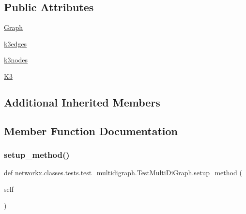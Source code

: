 \subsection*{Public Attributes}
\begin{DoxyCompactItemize}
\item 
\hyperlink{classnetworkx_1_1classes_1_1tests_1_1test__multidigraph_1_1TestMultiDiGraph_aa5a28c7ba894f6eb7af8f5b27f5449e2}{Graph}
\item 
\hyperlink{classnetworkx_1_1classes_1_1tests_1_1test__multidigraph_1_1TestMultiDiGraph_a51fcc9fcb2680f0d0c240ccc9b546bab}{k3edges}
\item 
\hyperlink{classnetworkx_1_1classes_1_1tests_1_1test__multidigraph_1_1TestMultiDiGraph_ae470089a4f2379afe18b8e01e306bbfd}{k3nodes}
\item 
\hyperlink{classnetworkx_1_1classes_1_1tests_1_1test__multidigraph_1_1TestMultiDiGraph_a66f4b4c41cbafa00e0a004fc75b03955}{K3}
\end{DoxyCompactItemize}
\subsection*{Additional Inherited Members}


\subsection{Member Function Documentation}
\mbox{\label{classnetworkx_1_1classes_1_1tests_1_1test__multidigraph_1_1TestMultiDiGraph_a24e8c5ea97f9d0b7fb908a70f6d1b9d5}} 
\subsubsection{\texorpdfstring{setup\+\_\+method()}{setup\_method()}}
{\footnotesize\ttfamily def networkx.\+classes.\+tests.\+test\+\_\+multidigraph.\+Test\+Multi\+Di\+Graph.\+setup\+\_\+method (\begin{DoxyParamCaption}\item[{}]{self }\end{DoxyParamCaption})}

